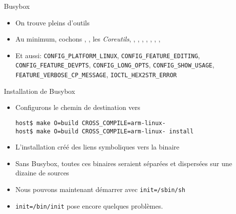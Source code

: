 \begin{frame}[fragile=singleslide]{Busybox}
  \begin{itemize}
  \item On trouve pleins d'outils
  \item    Au   minimum,    cochons    ,   ,    les
    \emph{Coreutils},    ,   ,   ,
    , , , , 
  \item         Et         aussi:        \verb+CONFIG_PLATFORM_LINUX+,
    \verb+CONFIG_FEATURE_EDITING+,        \verb+CONFIG_FEATURE_DEVPTS+,
    \verb+CONFIG_LONG_OPTS+,                  \verb+CONFIG_SHOW_USAGE+,
    \verb+FEATURE_VERBOSE_CP_MESSAGE+, \verb+IOCTL_HEX2STR_ERROR+
  \end{itemize}
\end{frame}

\begin{frame}[fragile=singleslide]{Installation de Busybox}
  \begin{itemize}
  \item Configurons le chemin de destination vers 
    \begin{lstlisting}
host$ make O=build CROSS_COMPILE=arm-linux-
host$ make O=build CROSS_COMPILE=arm-linux- install
    \end{lstlisting}
  \item  L'installation créé  des  liens symboliques  vers la  binaire
  \item  Sans  Busybox,  toutes  ces  binaires  seraient  séparées  et
    dispersées sur une dizaine de sources
  \item Nous pouvons maintenant démarrer avec \verb+init=/sbin/sh+
  \item \verb+init=/bin/init+ pose encore quelques problèmes.
  \end{itemize}
\end{frame}

